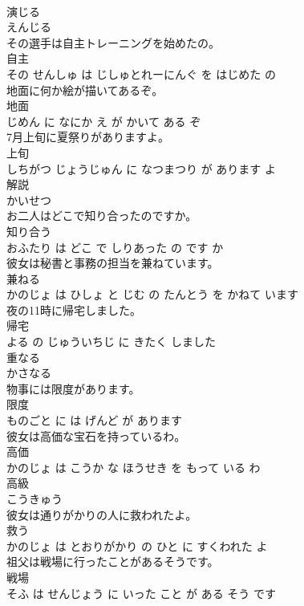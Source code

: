 \documentclass[8pt]{extreport}
\begin{document}
\begin{CJK}{UTF8}{min}
\\	演じる	
\\	えんじる			
\\	その選手は自主トレーニングを始めたの。	
\\	自主 
\\	その せんしゅ は じしゅとれーにんぐ を はじめた の			
\\	地面に何か絵が描いてあるぞ。	
\\	地面 
\\	じめん に なにか え が かいて ある ぞ			
\\	7月上旬に夏祭りがありますよ。	
\\	上旬 
\\	しちがつ じょうじゅん に なつまつり が あります よ			
\\	解説	
\\	かいせつ			
\\	お二人はどこで知り合ったのですか。	
\\	知り合う 
\\	おふたり は どこ で しりあった の です か			
\\	彼女は秘書と事務の担当を兼ねています。	
\\	兼ねる 
\\	かのじょ は ひしょ と じむ の たんとう を かねて います			
\\	夜の11時に帰宅しました。	
\\	帰宅 
\\	よる の じゅういちじ に きたく しました			
\\	重なる	
\\	かさなる			
\\	物事には限度があります。	
\\	限度 
\\	ものごと に は げんど が あります			
\\	彼女は高価な宝石を持っているわ。	
\\	高価 
\\	かのじょ は こうか な ほうせき を もって いる わ			
\\	高級	
\\	こうきゅう			
\\	彼女は通りがかりの人に救われたよ。	
\\	救う 
\\	かのじょ は とおりがかり の ひと に すくわれた よ			
\\	祖父は戦場に行ったことがあるそうです。	
\\	戦場 
\\	そふ は せんじょう に いった こと が ある そう です			

\end{CJK}
\end{document}
